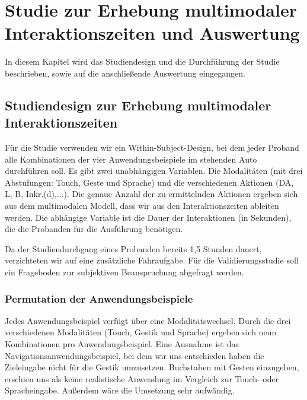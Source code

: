\chapter[Studie und Auswertung]{Studie zur Erhebung multimodaler Interaktionszeiten und Auswertung}\label{cha:Studie}
In diesem Kapitel wird das Studiendesign und die Durchführung der Studie beschrieben, sowie auf die anschließende Auswertung eingegangen.

\section[Studiendesign]{Studiendesign zur Erhebung multimodaler Interaktionszeiten}
Für die Studie verwenden wir ein Within-Subject-Design, bei dem jeder Proband alle Kombinationen der vier Anwendungsbeispiele im stehenden Auto durchführen soll. 
Es gibt zwei unabhängigen Variablen. Die Modalitäten (mit drei Abstufungen: Touch, Geste und Sprache) und die verschiedenen Aktionen (DA, L, B, Inkr.(d),...). Die genaue Anzahl der zu ermittelnden Aktionen ergeben sich aus dem multimodalen Modell, dass wir aus den Interaktionszeiten ableiten werden.
Die abhängige Variable ist die Dauer der Interaktionen (in Sekunden), die die Probanden für die Ausführung benötigen.

Da der Studiendurchgang eines Probanden bereits 1,5 Stunden dauert, verzichteten wir auf eine zusätzliche Fahraufgabe.
Für die Validierungsstudie soll ein Frageboden zur subjektiven Beanspruchung abgefragt werden.

\subsection[Permutation]{Permutation der Anwendungsbeispiele}
Jedes Anwendungsbeispiel verfügt über eine Modalitätswechsel.
Durch die drei verschiedenen Modalitäten (Touch, Gestik und Sprache) ergeben sich neun Kombinationen pro Anwendungsbeispiel. 
Eine Ausnahme ist das Navigationsanwendungsbeispiel, bei dem wir uns entschieden haben die Zieleingabe nicht für die Gestik umzusetzen. Buchstaben mit Gesten einzugeben, erschien uns als keine realistische Anwendung im Vergleich zur Touch- oder Spracheingabe. 
Außerdem wäre die Umsetzung sehr aufwändig.

